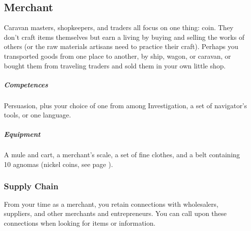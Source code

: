 \subsection*{Merchant} \label{ssec::merchant}
    Caravan masters, shopkeepers, and traders all focus on one thing: coin.
    They don't craft items themselves but earn a living by buying and selling the works of others (or the raw materials artisans need to practice their craft).
    Perhaps you transported goods from one place to another, by ship, wagon, or caravan, or bought them from traveling traders and sold them in your own little shop.
    \subparagraph{Competences} Persuasion, plus your choice of one from among Investigation, a set of navigator's tools, or one language.
    \subparagraph{Equipment} A mule and cart, a merchant's scale, a set of fine clothes, and a belt containing 10 agnomas (nickel coins, see page \pageref{sec::currency}).
    \subsubsection{Supply Chain}
        From your time as a merchant, you retain connections with wholesalers, suppliers, and other merchants and entrepreneurs.
        You can call upon these connections when looking for items or information.


%
